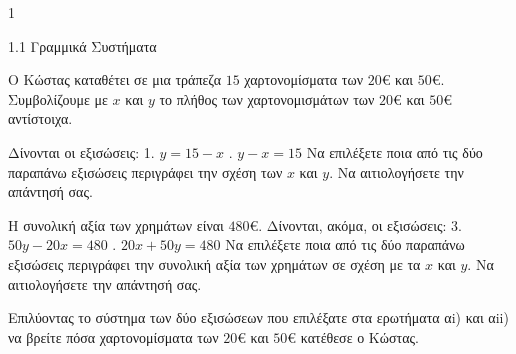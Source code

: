 \begin{ylh}{1}
\item 1.1 Γραμμικά Συστήματα
\end{ylh}
Ο Κώστας καταθέτει σε μια τράπεζα $15$ χαρτονομίσματα των $20$€ και $50$€. Συμβολίζουμε με $x$ και $y$ το πλήθος των χαρτονομισμάτων των $20$€ και $50$€ αντίστοιχα.
\begin{alist}
\item
\begin{rlist}
\item Δίνονται οι εξισώσεις:
1. $y = 15 - x$ . $y - x = 15$
Να επιλέξετε ποια από τις δύο παραπάνω εξισώσεις περιγράφει την σχέση των $x$ και $y$. Να αιτιολογήσετε την απάντησή σας.
\item Η συνολική αξία των χρημάτων είναι $480$€.
Δίνονται, ακόμα, οι εξισώσεις:
3. $50y - 20x = 480$ . $20x + 50y = 480$
Να επιλέξετε ποια από τις δύο παραπάνω εξισώσεις περιγράφει την συνολική αξία των χρημάτων σε σχέση με τα $x$ και $y$. Να αιτιολογήσετε την απάντησή σας.
\end{rlist}
\item Επιλύοντας το σύστημα των δύο εξισώσεων που επιλέξατε στα ερωτήματα αi) και αii) να βρείτε πόσα χαρτονομίσματα των $20$€ και $50$€ κατέθεσε ο Κώστας.
\end{alist}

